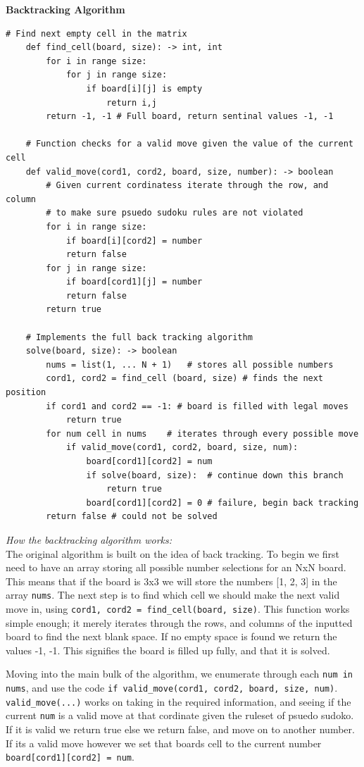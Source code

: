 \documentclass{article}
\begin{document}
\pagebreak

\noindent \textbf{Backtracking Algorithm}

\begin{lstlisting}[frame=single]
	# Find next empty cell in the matrix
	def find_cell(board, size): -> int, int
		for i in range size:
			for j in range size:
				if board[i][j] is empty
					return i,j 
		return -1, -1 # Full board, return sentinal values -1, -1

	# Function checks for a valid move given the value of the current cell
	def valid_move(cord1, cord2, board, size, number): -> boolean
		# Given current cordinatess iterate through the row, and column
		# to make sure psuedo sudoku rules are not violated
		for i in range size:
			if board[i][cord2] = number 
			return false
		for j in range size:
			if board[cord1][j] = number
			return false
		return true
	
	# Implements the full back tracking algorithm
	solve(board, size): -> boolean
		nums = list(1, ... N + 1)	# stores all possible numbers
		cord1, cord2 = find_cell (board, size) # finds the next position
		if cord1 and cord2 == -1: # board is filled with legal moves
			return true
		for num cell in nums	# iterates through every possible move
			if valid_move(cord1, cord2, board, size, num):
				board[cord1][cord2] = num
				if solve(board, size):	# continue down this branch
					return true
				board[cord1][cord2] = 0	# failure, begin back tracking
		return false # could not be solved
\end{lstlisting}

\textit{How the backtracking algorithm works:} \\

\medskip
	The original algorithm is built on the idea of back tracking. To begin we first
	need to have an array storing all possible number selections for an NxN board. This means that
	if the board is 3x3 we will store the numbers [1, 2, 3] in the array \verb|nums|. The next step is to find which cell we should
	make the next valid move in, using \verb|cord1, cord2 = find_cell(board, size)|. This function works simple enough;
	it merely iterates through the rows, and columns of the inputted board to find the next blank space. 
	If no empty space is found we return the values -1, -1. This signifies the board is filled up fully, and that it is solved.

	Moving into the main bulk of the algorithm, we enumerate through each \verb|num in nums|, and use the code
	\verb|if valid_move(cord1, cord2, board, size, num)|. \verb|valid_move(...)| works on taking in the required information,
	and seeing if the current \verb|num| is a valid move at that cordinate given the ruleset of psuedo sudoko. If it is valid we return true
	else we return false, and move on to another number. If its a valid move however we set that boards cell to the current number
	\verb|board[cord1][cord2] = num|.
\end{document}
